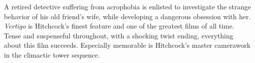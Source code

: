    A retired detective suffering from acrophobia is enlisted to investigate the strange behavior of his old friend's wife, while developing a dangerous obsession with her. \textit{Vertigo} is Hitchcock's finest feature and one of the greatest films of all time. Tense and suspenseful throughout, with a shocking twist ending, everything about this film succeeds. Especially memorable is Hitchcock's master camerawork in the climactic tower sequence. \author{DW} 
